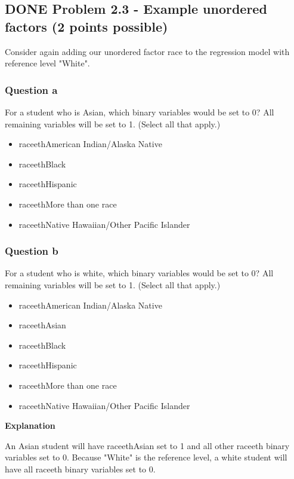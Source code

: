 \documentclass[letterpaper, 9pt, onecolumn, twoside, technote, final]{IEEEtran}
\begin{document}
\subsection{{\bfseries\sffamily DONE} Problem 2.3 - Example unordered factors (2 points possible)}
\label{sec-2-7}
Consider again adding our unordered factor race to the regression
model with reference level "White".

\subsubsection{Question a}
\label{sec-2-7-1}

For a student who is Asian, which binary variables would be set to 0?
All remaining variables will be set to 1. (Select all that apply.)

\begin{itemize}
\item raceethAmerican Indian/Alaska Native
\item raceethBlack
\item raceethHispanic
\item raceethMore than one race
\item raceethNative Hawaiian/Other Pacific Islander
\end{itemize}

\subsubsection{Question b}
\label{sec-2-7-2}

For a student who is white, which binary variables would be set to 0?
All remaining variables will be set to 1. (Select all that apply.)

\begin{itemize}
\item raceethAmerican Indian/Alaska Native
\item raceethAsian
\item raceethBlack
\item raceethHispanic
\item raceethMore than one race
\item raceethNative Hawaiian/Other Pacific Islander
\end{itemize}

\textbf{Explanation}

An Asian student will have raceethAsian set to 1 and all other raceeth
binary variables set to 0. Because "White" is the reference level, a
white student will have all raceeth binary variables set to 0.
\end{document}
